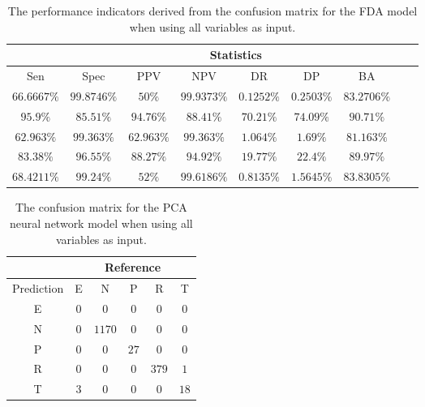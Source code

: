 \begin{table}[!ht]
	\centering
	\begin{tabular}{|c|c|c|c|c|c|c|c|c|}
		\hline
		 & \multicolumn{7}{c|}{Statistics} \\ \hline
		Sen & Spec & PPV & NPV & DR & DP & BA \\ \hline
		$66.6667\%$ & $99.8746\%$ & $50\%$ & $99.9373\%$ & $0.1252\%$ & $0.2503\%$ & $83.2706\%$ \\ \hline
		$95.9\%$ & $85.51\%$ & $94.76\%$ & $88.41\%$ & $70.21\%$ & $74.09\%$ & $90.71\%$ \\ \hline
		$62.963\%$ & $99.363\%$ & $62.963\%$ & $99.363\%$ & $1.064\%$ & $1.69\%$ & $81.163\%$ \\ \hline
		$83.38\%$ & $96.55\%$ & $88.27\%$ & $94.92\%$ & $19.77\%$ & $22.4\%$ & $89.97\%$ \\ \hline
		$68.4211\%$ & $99.24\%$ & $52\%$ & $99.6186\%$ & $0.8135\%$ & $1.5645\%$ & $83.8305\%$ \\ \hline
	\end{tabular}
	\caption{The performance indicators derived from the confusion matrix for the FDA model when using all variables as input.}
	\label{tab:cs:all:fda}
\end{table}

\begin{table}[!ht]
	\centering
	\begin{tabular}{|c|c|c|c|c|c|}
		\hline
		 & \multicolumn{5}{|c|}{Reference} \\ \hline
		 Prediction & E & N & P & R & T \\ \hline
		 E & $0$ & $0$ & $0$ & $0$ & $0$ \\ \hline
		 N & $0$ & $1170$ & $0$ & $0$ & $0$ \\ \hline
		 P & $0$ & $0$ & $27$ & $0$ & $0$ \\ \hline
		 R & $0$ & $0$ & $0$ & $379$ & $1$ \\ \hline
		 T & $3$ & $0$ & $0$ & $0$ & $18$ \\ \hline
	\end{tabular}
	\caption{The confusion matrix for the PCA neural network model when using all variables as input.}
	\label{tab:cm:all:pcaNNet}
\end{table}

